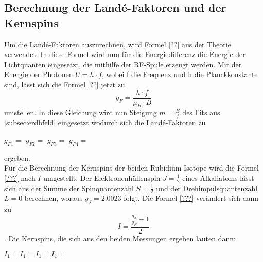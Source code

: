 \subsection{Berechnung der Landé-Faktoren und der Kernspins}
\label{subsec:lande}
Um die Landé-Faktoren auszurechnen, wird Formel \eqref{??} aus der Theorie verwendet. In diese Formel wird nun für die Energiedifferenz die Energie der Lichtquanten eingesetzt, die mithilfe der RF-Spule erzeugt werden. Mit der Energie der Photonen $U = h\cdot f$, wobei f die Frequenz und h die Planckkonstante sind, lässt sich die Formel \eqref{??} jetzt zu
\begin{equation}
  g_F = \frac{h\cdot f}{\mu_B\cdot B}
  \label{eqn:landefaktor}
\end{equation}
umstellen. In diese Gleichung wird nun Steigung $m = \frac{B}{f}$ des Fits aus \ref{subsec:erdbfeld} eingesetzt wodurch sich die Landé-Faktoren zu
\begin{center}
  $g_{F1} = $ $g_{F2} = $ $g_{F3} = $ $g_{F4} = $
\end{center}
ergeben.\\
Für die Berechnung der Kernspins der beiden Rubidium Isotope wird die Formel \eqref{???} nach $I$ umgestellt. Der Elektronenhüllenspin $J = \frac{1}{2}$ eines Alkaliatoms lässt sich aus der Summe der Spinquantenzahl $S = \frac{1}{2}$ und der Drehimpulsquantenzahl $L = 0$ berechnen, woraus $g_J = 2.0023$ folgt. Die Formel \eqref{???} verändert sich dann zu
\begin{equation}
  I = \frac{\frac{g_J}{g_F}-1}{2}
  \label{eqn:kernspin}
\end{equation}.
Die Kernspins, die sich aus den beiden Messungen ergeben lauten dann:
\begin{center}
  $I_1 =$$I_1 =$$I_1 =$$I_1 =$
\end{center}
